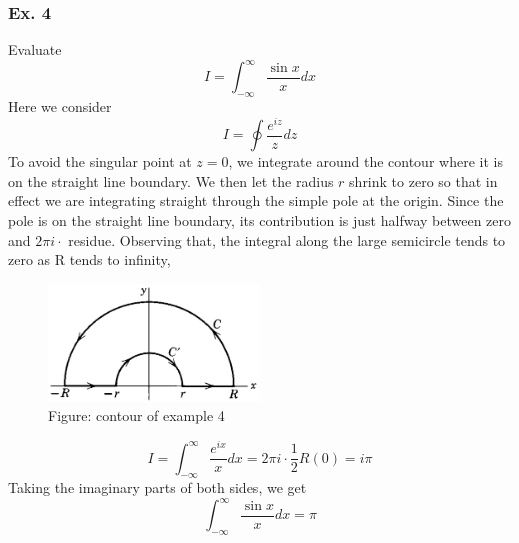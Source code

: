 \documentclass[../main.tex]{subfiles}
\begin{document}
\subsubsection*{Ex. 4} Evaluate
\begin{equation*}
    I=\int_{-\infty}^{\infty}\frac{\sin x}{x}dx
\end{equation*}
Here we consider
\begin{equation*}
    I=\oint \frac{e^{iz}}{z}dz
\end{equation*}
To avoid the singular point at $z = 0$, we integrate around the contour where it is on the straight line boundary. We then let the radius $r$ shrink to zero so that in effect we are integrating straight through the simple pole at the origin. Since the pole is on the straight line boundary, its contribution is just 
halfway between zero and $2\pi i\cdot$ residue.  Observing that, the integral along the large semicircle tends to zero as R tends to inﬁnity,
\begin{figure}[b]
    \centering
    \includegraphics[width=0.5\textwidth]{../Rss/Com/Residue2.png}
    \caption*{Figure: contour of example 4}
\end{figure}
\begin{equation*}
    I=\int_{-\infty}^{\infty} \frac{e^{ix}}{x}dx=2\pi i\cdot\frac{1}{2}R(0)=i\pi
\end{equation*}
Taking the imaginary parts of both sides, we get
\begin{equation*}
    \int_{-\infty}^{\infty} \frac{\sin x}{x}dx=\pi
\end{equation*}
\end{document}

